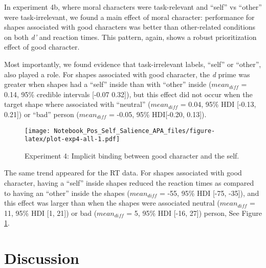 \documentclass[
  man]{apa6}
\begin{document}
In experiment 4b, where moral characters were task-relevant and ``self'' vs ``other'' were task-irrelevant, we found a main effect of moral character: performance for shapes associated with good characters was better than other-related conditions on both \emph{d'} and reaction times. This pattern, again, shows a robust prioritization effect of good character.

Most importantly, we found evidence that task-irrelevant labels, ``self'' or ``other'', also played a role. For shapes associated with good character, the \emph{d} prime was greater when shapes had a ``self'' inside than with ``other'' inside (\(mean_{diff}\) = 0.14, 95\% credible intervals {[}-0.07 0.32{]}), but this effect did not occur when the target shape where associated with ``neutral'' (\(mean_{diff}\) = 0.04, 95\% HDI {[}-0.13, 0.21{]}) or ``bad'' person (\(mean_{diff}\) = -0.05, 95\% HDI{[}-0.20, 0.13{]}).

\begin{figure}
\centering
\texttt{[image: Notebook\_Pos\_Self\_Salience\_APA\_files/figure-latex/plot-exp4-all-1.pdf]}
\caption{\label{fig:plot-exp4-all}Experiment 4: Implicit binding between good character and the self.}
\end{figure}

The same trend appeared for the RT data. For shapes associated with good character, having a ``self'' inside shapes reduced the reaction times as compared to having an ``other'' inside the shapes (\(mean_{diff}\) = -55, 95\% HDI {[}-75, -35{]}), and this effect was larger than when the shapes were associated neutral (\(mean_{diff}\) = 11, 95\% HDI {[}1, 21{]}) or bad (\(mean_{diff}\) = 5, 95\% HDI {[}-16, 27{]}) person, See Figure \ref{fig:plot-exp4-all}.

\hypertarget{discussion}{%
\section{Discussion}\label{discussion}}
\end{document}
